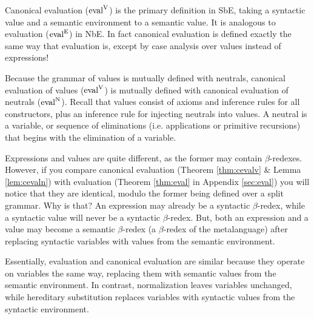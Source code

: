 \documentclass[runningheads,a4paper]{llncs}
\newcommand{\refthm}[1]{Theorem \ref{thm:#1}}
\newcommand{\reflem}[1]{Lemma \ref{lem:#1}}
\newcommand{\refapp}[1]{Appendix \ref{sec:#1}}
\def\eval{\fun{eval}^\con{E}}
\def\cevalv{\fun{eval}^\con{V}}
\def\cevaln{\fun{eval}^\con{N}}
\newcommand{\con}[1]{\textmd{#1}}
\newcommand{\fun}[1]{\textmd{#1}}
\begin{document}
Canonical evaluation ($\cevalv$) is the primary definition in SbE, taking a
syntactic value and a semantic environment to a semantic value. It is
analogous to evaluation ($\eval$) in NbE. In fact canonical evaluation
is defined exactly the same way that evaluation is, except by case
analysis over values instead of expressions!

Because the grammar of values is mutually defined with neutrals,
canonical evaluation of values ($\cevalv$) is mutually defined with canonical
evaluation of neutrals ($\cevaln$). Recall that values consist of axioms and
inference rules for all constructors, plus an inference rule for
injecting neutrals into values. A neutral is a variable, or 
sequence of eliminations (i.e. applications or primitive recursions)
that begins with the elimination of a variable.

Expressions and values are quite different, as the former
may contain $\beta$-redexes. However, if you compare
canonical evaluation (\refthm{cevalv} \& \reflem{cevaln}) with
evaluation (\refthm{eval} in \refapp{eval}) you will notice that they are identical,
modulo the former being defined over a split grammar. Why is that?
An expression may already be a syntactic $\beta$-redex, while a
syntactic value will never be a syntactic $\beta$-redex. But, both an
expression and a value may become a semantic $\beta$-redex (a
$\beta$-redex of the metalanguage) after replacing syntactic variables
with values from the semantic environment. 

Essentially, evaluation and canonical evaluation are similar because
they operate on variables the same way, replacing them with semantic
values from the semantic environment. In contrast,
normalization leaves variables unchanged, while hereditary
substitution replaces variables with syntactic values from the
syntactic environment. 
\end{document}
